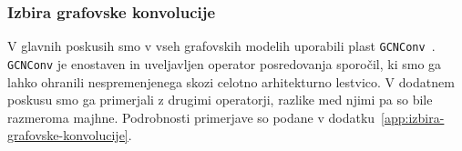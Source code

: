 \subsubsection*{Izbira grafovske konvolucije}
\label{subsec:izbira-grafovske-konvolucije}

\enlargethispage{2\baselineskip}
V glavnih poskusih smo v vseh grafovskih modelih uporabili plast \texttt{GCNConv}~\cite{kipf2017gcn}.
\texttt{GCNConv} je enostaven in uveljavljen operator posredovanja sporočil, ki smo ga lahko ohranili nespremenjenega skozi celotno arhitekturno lestvico.
V dodatnem poskusu smo ga primerjali z drugimi operatorji, razlike med njimi pa so bile razmeroma majhne.
Podrobnosti primerjave so podane v dodatku~\ref{app:izbira-grafovske-konvolucije}.
